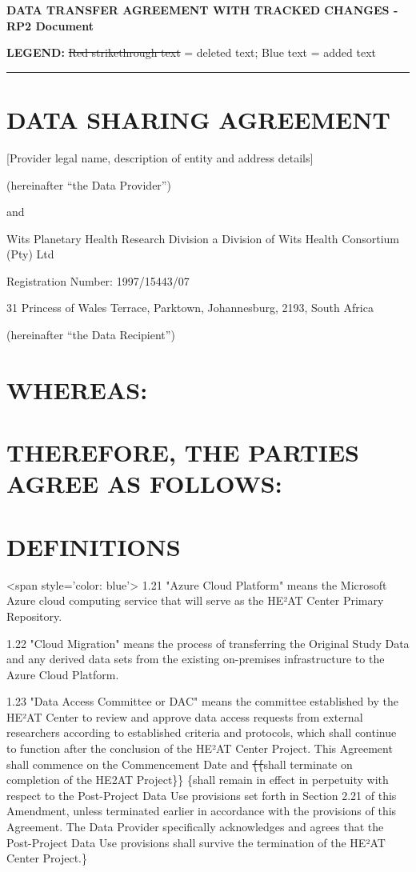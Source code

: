 \documentclass[12pt,letterpaper]{article}
\newcommand{\deleted}[1]{\textcolor{deletecolor}{\sout{#1}}}
\newcommand{\added}[1]{\textcolor{addcolor}{#1}}
\begin{document}
\onehalfspacing
\begin{center}
\textbf{\Large DATA TRANSFER AGREEMENT WITH TRACKED CHANGES - RP2 Document}
\end{center}
\textbf{LEGEND:} \deleted{Red strikethrough text} = deleted text; \added{Blue text} = added text
\vspace{0.5cm}
\hrule
\vspace{0.5cm}
\section*{DATA SHARING AGREEMENT}

[Provider legal name, description of entity and address details]

(hereinafter “the Data Provider”)

and

Wits Planetary Health Research Division a Division of Wits Health Consortium (Pty) Ltd

Registration Number: 1997/15443/07

31 Princess of Wales Terrace, Parktown, Johannesburg, 2193, South Africa

(hereinafter “the Data Recipient”)

\section*{WHEREAS:}

\section*{THEREFORE, THE PARTIES AGREE AS FOLLOWS:}

\section*{DEFINITIONS}

<span style='color: blue'> 1.21 "Azure Cloud Platform" means the Microsoft Azure cloud computing service that will serve as the HE²AT Center Primary Repository.

1.22 "Cloud Migration" means the process of transferring the Original Study Data and any derived data sets from the existing on-premises infrastructure to the Azure Cloud Platform.

1.23 "Data Access Committee or DAC" means the committee established by the HE²AT Center to review and approve data access requests from external researchers according to established criteria and protocols, which shall continue to function after the conclusion of the HE²AT Center Project. This Agreement shall commence on the Commencement Date and \deleted\{\deleted\{shall terminate on completion of the HE2AT Project\}\} \added\{shall remain in effect in perpetuity with respect to the Post-Project Data Use provisions set forth in Section 2.21 of this Amendment, unless terminated earlier in accordance with the provisions of this Agreement. The Data Provider specifically acknowledges and agrees that the Post-Project Data Use provisions shall survive the termination of the HE²AT Center Project.\}
\end{document}
